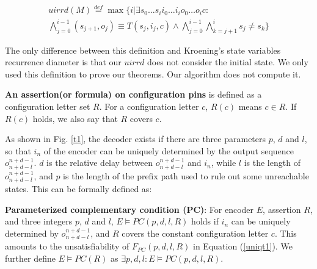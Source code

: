 \documentclass[journal]{IEEEtran}
\begin{document}
\begin{equation}\label{equ_uisvrd}
\begin{split}
uirrd(M)\stackrel{def}{=}\max\{i|\exists s_0 \dots s_i  i_0 \dots i_i o_0 \dots o_ic:\\
\bigwedge^{i-1}_{j=0}(s_{j+1},o_j)\equiv T(s_j,i_j,c)\wedge\bigwedge^{i-1}_{j=0}\bigwedge^{i}_{k=j+1}s_{j}\ne s_{k}\}
\end{split}
\end{equation}

The only difference between this definition and Kroening's state variables recurrence diameter\cite{RecDiam} is that
our $uirrd$ does not consider the initial state.
We only used this definition to prove our theorems.
Our algorithm does not compute it.

\textbf{An assertion(or formula) on configuration pins} is defined as a configuration letter set $R$.
For a configuration letter $c$,
$R(c)$ means $c\in R$.
If $R(c)$ holds,
we also say that $R$ covers $c$.

As shown in Fig. \ref{t1},
the decoder exists if there are three parameters $p$, $d$ and $l$,
so that $i_n$ of the encoder can be uniquely determined by the output sequence $o_{n+d-l}^{n+d-1}$.
$d$ is the relative delay between $o_{n+d-l}^{n+d-1}$ and $i_n$,
while $l$ is the length of $o_{n+d-l}^{n+d-1}$,
and $p$ is the length of the prefix path used to rule out some unreachable states.
This can be formally defined as:

\begin{definition11}\label{def_pcc}%
\textbf{Parameterized complementary condition (PC)}:
For encoder $E$,
assertion $R$,
and three integers $p$, $d$ and $l$,
$E\vDash PC(p,d,l,R)$ holds if
$i_n$ can be uniquely determined by $o_{n+d-l}^{n+d-1}$,
and $R$ covers the constant configuration letter $c$.
This amounts to the unsatisfiability of $F_{PC}(p,d,l,R)$ in Equation (\ref{uniqt1}).
We further define $E\vDash PC(R)$ as $\exists p,d,l:E\vDash PC(p,d,l,R)$.
\end{definition11}
\end{document}

